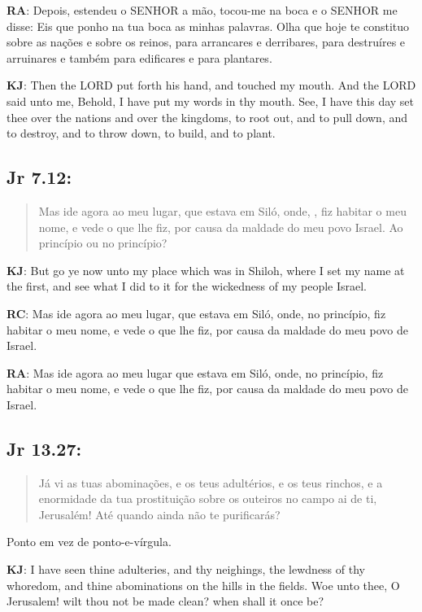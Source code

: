 \textbf{RA}: Depois, estendeu o SENHOR a mão, tocou-me na boca e o SENHOR me disse: Eis que ponho na tua boca as minhas palavras. Olha que hoje te constituo sobre as nações e sobre os reinos, para arrancares e derribares, para destruíres e arruinares e também para edificares e para plantares.

\textbf{KJ}: Then the LORD put forth his hand, and touched my mouth. And the LORD said unto me, Behold, I have put my words in thy mouth. See, I have this day set thee over the nations and over the kingdoms, to root out, and to pull down, and to destroy, and to throw down, to build, and to plant.

\subsection*{Jr 7.12:} 
 \begin{quote}
  \small
 Mas ide agora ao meu lugar, que estava em Siló, onde, , fiz habitar o meu nome, e vede o que lhe fiz, por causa da maldade do meu povo Israel.
Ao princípio ou no princípio?
\end{quote}

\textbf{KJ}: But go ye now unto my place which was in Shiloh, where I set my name at the first, and see what I did to it for the wickedness of my people Israel.

\textbf{RC}: Mas ide agora ao meu lugar, que estava em Siló, onde, no princípio, fiz habitar o meu nome, e vede o que lhe fiz, por causa da maldade do meu povo de Israel.

\textbf{RA}: Mas ide agora ao meu lugar que estava em Siló, onde, no princípio, fiz habitar o meu nome, e vede o que lhe fiz, por causa da maldade do meu povo de Israel.

\subsection*{Jr 13.27:} 
 \begin{quote}
  \small
 Já vi as tuas abominações, e os teus adultérios, e os teus rinchos, e a enormidade da tua prostituição sobre os outeiros no campo\uwave{;} ai de ti, Jerusalém! Até quando ainda não te purificarás?
\end{quote}

Ponto em vez de ponto-e-vírgula.

\textbf{KJ}: I have seen thine adulteries, and thy neighings, the lewdness of thy whoredom, and thine abominations on the hills in the fields. Woe unto thee, O Jerusalem! wilt thou not be made clean? when shall it once be?

